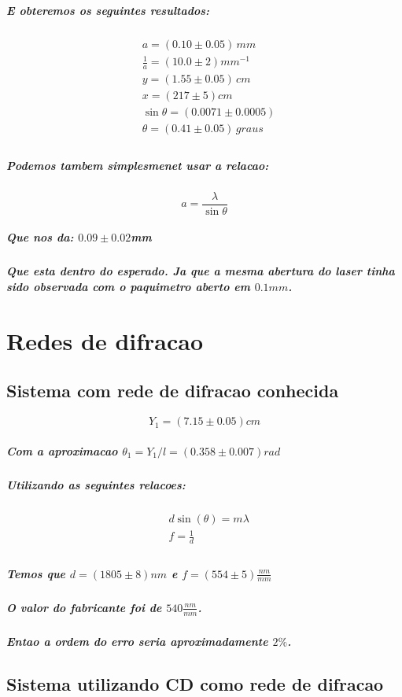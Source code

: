 \documentclass[12pt,twoside, a4paper, twocolumn]{article}
\begin{document}
\subparagraph*{E obteremos os seguintes resultados:}

\begin{equation}
  \begin{aligned}
     & a =(0.10 \pm 0.05)\,mm             \\
     & \frac{1}{a} = (10.0 \pm 2)mm^{-1}  \\
     & y = (1.55 \pm 0.05)\,cm            \\
     & x = (217 \pm 5)cm                  \\
     & \sin{\theta} = (0.0071 \pm 0.0005) \\
     & \theta = (0.41 \pm 0.05)\,graus    \\
  \end{aligned}
\end{equation}

\subparagraph*{Podemos tambem simplesmenet usar a relacao:}

\begin{equation}
  a = \frac{\lambda}{\sin{\theta}}
\end{equation}

\subparagraph*{Que nos da: $0.09 \pm 0.02$mm}

\subparagraph*{Que esta dentro do esperado. Ja que a mesma abertura do laser tinha sido observada com o paquimetro aberto em $0.1mm$.}

\newpage

\pagebreak

\section{Redes de difracao}

\subsection{Sistema com rede de difracao conhecida}

\begin{equation}
  Y_1 = (7.15 \pm 0.05)cm
\end{equation}


\subparagraph*{Com a aproximacao $\theta_1 = Y_1/l = (0.358 \pm 0.007)rad$}

\subparagraph*{Utilizando as seguintes relacoes:}

\begin{equation}
  \begin{aligned}
     & d \sin(\theta) = m \lambda \\
     & f = \frac{1}{d}            \\
  \end{aligned}
\end{equation}

\subparagraph*{Temos que $d = (1805 \pm 8) nm$ e $f = (554 \pm 5) \frac{nm}{mm}$ }

\subparagraph*{O valor do fabricante foi de  $540 \frac{nm}{mm}$.}

\subparagraph*{Entao a ordem do erro seria aproximadamente $2\%$.}

\subsection{Sistema utilizando CD como rede de difracao}
\end{document}

